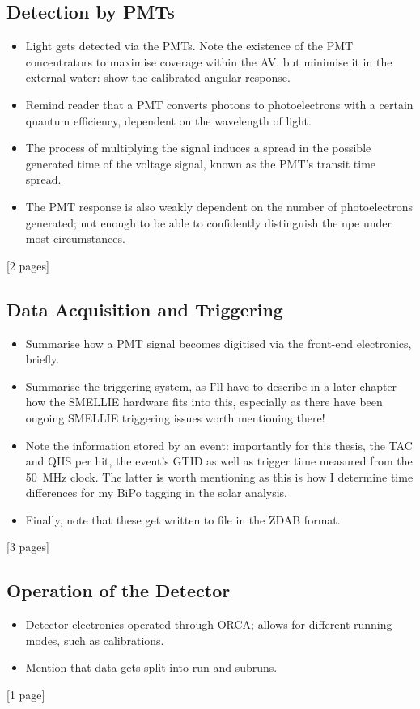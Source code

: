 {    \subsection{Detection by PMTs}\label{sec:pmts}
    \begin{itemize}
        \item Light gets detected via the PMTs. Note the existence of the PMT concentrators to maximise coverage within the AV, but minimise it in the external water: show the calibrated angular response.
        \item Remind reader that a PMT converts photons to photoelectrons with a certain quantum efficiency, dependent on the wavelength of light.
        \item The process of multiplying the signal induces a spread in the possible generated time of the voltage signal, known as the PMT's transit time spread.
        \item The PMT response is also weakly dependent on the number of photoelectrons generated; not enough to be able to confidently distinguish the npe under most circumstances.
    \end{itemize}
    [2 pages]
    \subsection{Data Acquisition and Triggering}
    \begin{itemize}
        \item Summarise how a PMT signal becomes digitised via the front-end electronics, briefly.
        \item Summarise the triggering system, as I'll have to describe in a later chapter how the SMELLIE hardware fits into this, especially as there have been ongoing SMELLIE triggering issues worth mentioning there!
        \item Note the information stored by an event: importantly for this thesis, the TAC and QHS per hit, the event's GTID as well as trigger time measured from the \SI{50}{\mega\Hz} clock. The latter is worth mentioning as this is how I determine time differences for my BiPo tagging in the solar analysis.
        \item Finally, note that these get written to file in the ZDAB format.
    \end{itemize}
    [3 pages]
    \subsection{Operation of the Detector}
    \begin{itemize}
        \item Detector electronics operated through ORCA; allows for different running modes, such as calibrations.
        \item Mention that data gets split into run and subruns.
    \end{itemize}
    [1 page]
}

